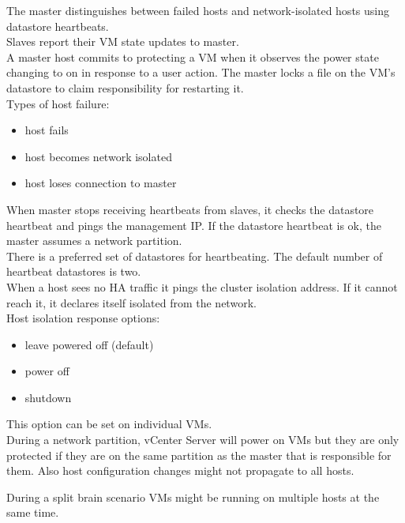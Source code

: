 The master distinguishes between failed hosts and network-isolated hosts using
datastore heartbeats.\\

Slaves report their VM state updates to master.\\

A master host commits to protecting a VM when it observes the power state
changing to on in response to a user action. The master locks a file on the
VM's datastore to claim responsibility for restarting it.\\

Types of host failure:

\begin{itemize}
\item host fails
\item host becomes network isolated
\item host loses connection to master
\end{itemize}

When master stops receiving heartbeats from slaves, it checks the datastore
heartbeat and pings the management IP. If the datastore heartbeat is ok, the
master assumes a network partition.\\

There is a preferred set of datastores for heartbeating. The default number
of heartbeat datastores is two.\\

When a host sees no HA traffic it pings the cluster isolation address. If it
cannot reach it, it declares itself isolated from the network.\\

Host isolation response options:

\begin{itemize}
\item leave powered off (default)
\item power off
\item shutdown
\end{itemize}

This option can be set on individual VMs.\\

During a network partition, vCenter Server will power on VMs but they are
only protected if they are on the same partition as the master that is
responsible for them. Also host configuration changes might not propagate to
all hosts.

During a split brain scenario VMs might be running on multiple hosts at the
same time.\\

